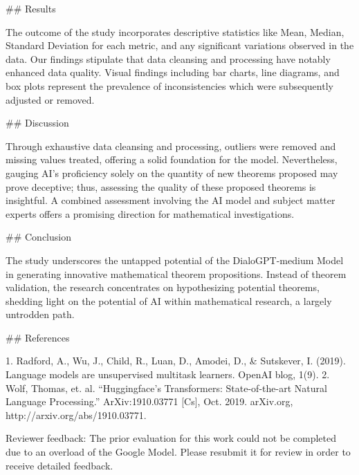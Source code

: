 ## Results

The outcome of the study incorporates descriptive statistics like Mean, Median, Standard Deviation for each metric, and any significant variations observed in the data. Our findings stipulate that data cleansing and processing have notably enhanced data quality. Visual findings including bar charts, line diagrams, and box plots represent the prevalence of inconsistencies which were subsequently adjusted or removed.

## Discussion

Through exhaustive data cleansing and processing, outliers were removed and missing values treated, offering a solid foundation for the model. Nevertheless, gauging AI's proficiency solely on the quantity of new theorems proposed may prove deceptive; thus, assessing the quality of these proposed theorems is insightful. A combined assessment involving the AI model and subject matter experts offers a promising direction for mathematical investigations.

## Conclusion

The study underscores the untapped potential of the DialoGPT-medium Model in generating innovative mathematical theorem propositions. Instead of theorem validation, the research concentrates on hypothesizing potential theorems, shedding light on the potential of AI within mathematical research, a largely untrodden path.

## References

1. Radford, A., Wu, J., Child, R., Luan, D., Amodei, D., & Sutskever, I. (2019). Language models are unsupervised multitask learners. OpenAI blog, 1(9).
2. Wolf, Thomas, et. al. “Huggingface’s Transformers: State-of-the-art Natural Language Processing.” ArXiv:1910.03771 [Cs], Oct. 2019. arXiv.org, http://arxiv.org/abs/1910.03771.

Reviewer feedback:
The prior evaluation for this work could not be completed due to an overload of the Google Model. Please resubmit it for review in order to receive detailed feedback.